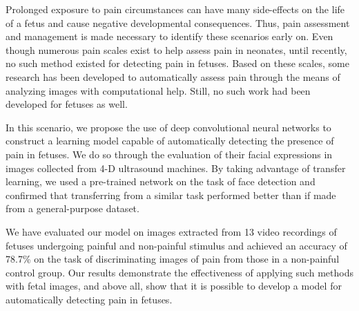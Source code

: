 Prolonged exposure to pain circumstances can have many side-effects on the life of a fetus and cause negative developmental consequences. Thus, pain assessment and management is made necessary to identify these scenarios early on. Even though numerous pain scales exist to help assess pain in neonates, until recently, no such method existed for detecting pain in fetuses. Based on these scales, some research has been developed to automatically assess pain through the means of analyzing images with computational help. Still, no such work had been developed for fetuses as well.

In this scenario, we propose the use of deep convolutional neural networks to construct a learning model capable of automatically detecting the presence of pain in fetuses. We do so through the evaluation of their facial expressions in images collected from 4-D ultrasound machines. By taking advantage of transfer learning, we used a pre-trained network on the task of face detection and confirmed that transferring from a similar task performed better than if made from a general-purpose dataset. 

We have evaluated our model on images extracted from 13 video recordings of fetuses undergoing painful and non-painful stimulus and achieved an accuracy of 78.7\% on the task of discriminating images of pain from those in a non-painful control group. Our results demonstrate the effectiveness of applying such methods with fetal images, and above all, show that it is possible to develop a model for automatically detecting pain in fetuses.

